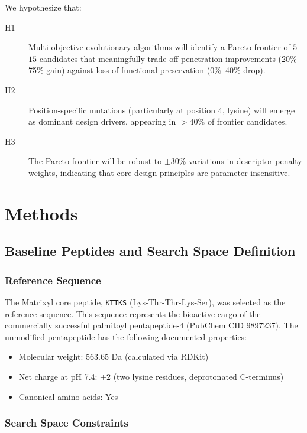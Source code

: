 \documentclass[11pt,a4paper]{article}
\begin{document}
We hypothesize that:
\begin{description}
  \item[H1] Multi-objective evolutionary algorithms will identify a Pareto frontier of $5$--$15$ candidates that meaningfully trade off penetration improvements (20\%--75\% gain) against loss of functional preservation (0\%--40\% drop).
  \item[H2] Position-specific mutations (particularly at position 4, lysine) will emerge as dominant design drivers, appearing in $>40\%$ of frontier candidates.
  \item[H3] The Pareto frontier will be robust to $\pm 30\%$ variations in descriptor penalty weights, indicating that core design principles are parameter-insensitive.
\end{description}

\section{Methods}

\subsection{Baseline Peptides and Search Space Definition}

\subsubsection{Reference Sequence}

The Matrixyl core peptide, \texttt{KTTKS} (Lys-Thr-Thr-Lys-Ser), was selected as the reference sequence. This sequence represents the bioactive cargo of the commercially successful palmitoyl pentapeptide-4 (PubChem CID 9897237). The unmodified pentapeptide has the following documented properties:
\begin{itemize}
  \item Molecular weight: 563.65 Da (calculated via RDKit)
  \item Net charge at pH 7.4: $+2$ (two lysine residues, deprotonated C-terminus)
  \item Canonical amino acids: Yes
\end{itemize}

\subsubsection{Search Space Constraints}
\end{document}
